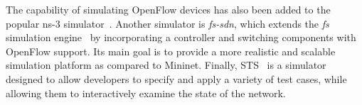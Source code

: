 The capability of simulating OpenFlow devices has also been added to the popular ns-3 simulator~\cite{ns3project2013}.  
Another simulator is \textit{fs-sdn}, which extends the \textit{fs} simulation engine~\cite{sommers2011} by incorporating a controller and switching components with OpenFlow support.
Its main goal is to provide a more realistic and scalable simulation platform as compared to Mininet.
Finally, STS~\cite{ucbsts2013} is a simulator designed to allow developers to specify and apply a variety of test cases, while allowing them to interactively examine the state of the network.

